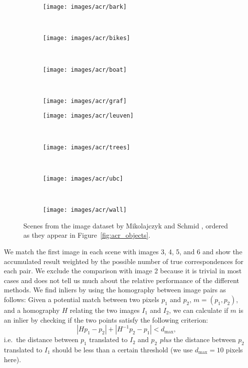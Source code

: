 \documentclass[10pt,journal,cspaper,compsoc]{IEEEtran}
\begin{document}
\begin{figure}[htb]
    \begin{subfigure}[t]{0.24\columnwidth}
        \centering
        \texttt{[image: images/acr/bark]}
    \end{subfigure}%
    ~ %
    \begin{subfigure}[t]{0.24\columnwidth}
        \centering
        \texttt{[image: images/acr/bikes]}
    \end{subfigure}%
    ~ %
    \begin{subfigure}[t]{0.24\columnwidth}
        \centering
        \texttt{[image: images/acr/boat]}
    \end{subfigure}%
    ~ %
    \begin{subfigure}[t]{0.24\columnwidth}
        \centering
        \texttt{[image: images/acr/graf]}
    \end{subfigure}%
    \vspace{1.5 mm}
    \begin{subfigure}[t]{0.24\columnwidth}
        \centering
        \texttt{[image: images/acr/leuven]}
    \end{subfigure}%
    ~ %
    \begin{subfigure}[t]{0.24\columnwidth}
        \centering
        \texttt{[image: images/acr/trees]}
    \end{subfigure}%
    ~ %
    \begin{subfigure}[t]{0.24\columnwidth}
        \centering
        \texttt{[image: images/acr/ubc]}
    \end{subfigure}%
    ~ %
    \begin{subfigure}[t]{0.24\columnwidth}
        \centering
        \texttt{[image: images/acr/wall]}
    \end{subfigure}%
    \caption{Scenes from the image dataset by Mikolajczyk and Schmid 
    \cite{mikolajczyk2005performance}, ordered as they appear in 
Figure~\ref{fig:acr_objects}.}
    \label{fig:acr_images}
\end{figure}


We match the first image in each scene with images 3, 4, 5, 
and 6 and show the accumulated result weighted by the possible number of 
true correspondences for each pair. We exclude the comparison with image 
2 because it is trivial in most cases and does not tell us much about 
the relative performance of the different methods. We find inliers by 
using the homography between image pairs as follows: Given a potential 
match between two pixels $p_1$ and $p_2$, $m = \left(p_1, p_2\right)$, 
and a homography $H$ relating the two images $I_1$ and $I_2$, we can 
calculate if $m$ is an inlier by checking if the two points satisfy the 
following criterion:
\begin{equation*}
\left\vert H p_1 - p_2 \right\vert + \left\vert H^{-1}p_2 - p_1 \right\vert < d_{\max},
\end{equation*}
i.e.\ the distance between $p_1$ translated to $I_2$ and $p_2$ 
\emph{plus} the distance between $p_2$ translated to $I_1$ should be 
less than a certain threshold (we use $d_{\max}=10$ pixels here).
\end{document}
